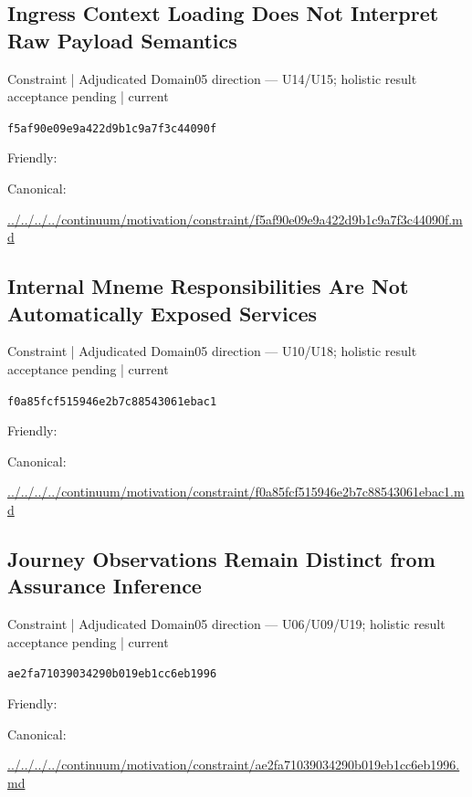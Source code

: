 \documentclass[10pt,a4paper]{article}
\begin{document}
\subsection*{Ingress Context Loading Does Not Interpret Raw Payload Semantics}
{\small Constraint | Adjudicated Domain05 direction — U14/U15; holistic result acceptance pending | current}\par
\texttt{f5af90e09e9a422d9b1c9a7f3c44090f}\par
Friendly: \par
Canonical: \par
{\footnotesize\url{../../../../continuum/motivation/constraint/f5af90e09e9a422d9b1c9a7f3c44090f.md}}\par
\subsection*{Internal Mneme Responsibilities Are Not Automatically Exposed Services}
{\small Constraint | Adjudicated Domain05 direction — U10/U18; holistic result acceptance pending | current}\par
\texttt{f0a85fcf515946e2b7c88543061ebac1}\par
Friendly: \par
Canonical: \par
{\footnotesize\url{../../../../continuum/motivation/constraint/f0a85fcf515946e2b7c88543061ebac1.md}}\par
\subsection*{Journey Observations Remain Distinct from Assurance Inference}
{\small Constraint | Adjudicated Domain05 direction — U06/U09/U19; holistic result acceptance pending | current}\par
\texttt{ae2fa71039034290b019eb1cc6eb1996}\par
Friendly: \par
Canonical: \par
{\footnotesize\url{../../../../continuum/motivation/constraint/ae2fa71039034290b019eb1cc6eb1996.md}}\par
\end{document}
